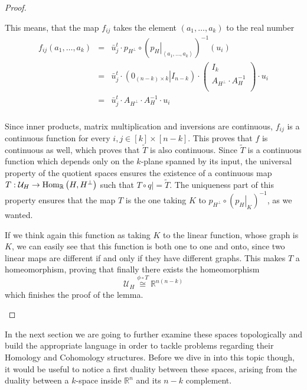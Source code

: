 \begin{proof}
\begin{b_item}
This means, that the map $f_{ij}$ takes the element $\left(a_1,\ldots,a_k\right)$ to the real number
$$\begin{array}{rcl}f_{ij}\left(a_1,\ldots,a_k\right)
&=&\bar{u}_j^t\cdot p_{H^{\perp}}\circ\left(\left.p_H\right|_{\left<a_1,\ldots,a_k\right>}\right)^{-1}(u_i)\\
&=&\bar{u}_j^t\cdot\left(\left.0_{(n-k)\times k}\right|I_{n-k}\right)\cdot\left(\begin{array}{c}I_k\\\hline A_{H^{\perp}}\cdot A_H^{-1}\\\end{array}\right)\cdot u_i\\
&=&\bar{u}_j^t\cdot A_{H^{\perp}}\cdot A_H^{-1}\cdot u_i\\
\end{array}$$

Since inner products, matrix multiplication and inversions are continuous, $f_{ij}$ is a continuous function for every $i,j\in[k]\times[n-k]$. This proves that $f$ is continuous as well, which proves that $\tilde T$ is also continuous. Since $\tilde T$ is a continuous function which depends only on the $k$-plane spanned by its input, the universal property of the quotient spaces ensures the existence of a continuous map $T:\mathcal{U}_H\to\mathrm{Hom}_{\mathbb{R}}\left(H,H^{\perp}\right)$ such that $T\circ \left.q\right|=\tilde T$. The uniqueness part of this property ensures that the map $T$ is the one taking $K$ to $p_{H^{\perp}}\circ\left(\left.p_H\right|_K\right)^{-1}$, as we wanted.

If we think again this function as taking $K$ to the linear function, whose graph is $K$, we can easily see that this function is both one to one and onto, since two linear maps are different if and only if they have different graphs. This makes $T$ a homeomorphism, proving that finally there exists the homeomorphism
$$\mathcal{U}_H\overset{\phi\circ T}{\cong}\mathbb{R}^{n(n-k)}$$
which finishes the proof of the lemma.
\end{b_item}
\end{proof}

In the next section we are going to further examine these spaces topologically and build the appropriate language in order to tackle problems regarding their Homology and Cohomology structures. Before we dive in into this topic though, it would be useful to notice a first duality between these spaces, arising from the duality between a $k$-space inside $\mathbb{R}^n$ and its $n-k$ complement.

